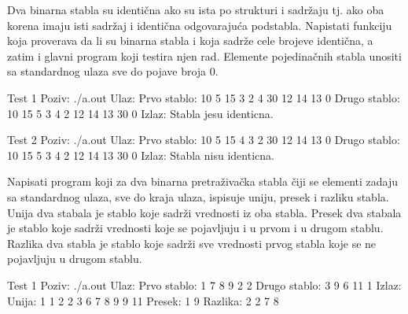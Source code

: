 \begin{Exercise}[label=707]
Dva binarna stabla su identična ako su ista po strukturi i sadržaju tj. ako oba korena imaju isti sadržaj i identična odgovarajuća podstabla. Napistati funkciju  koja proverava da li su binarna stabla  i  koja sadrže cele brojeve identična, a zatim i glavni program koji testira njen rad. Elemente pojedinačnih stabla unositi sa standardnog ulaza sve do pojave broja $0$.

\begin{maxitest}
\begin{test}{Test 1}
Poziv: ./a.out
Ulaz:
	Prvo stablo: 10 5 15 3 2 4 30 12 14 13 0
	Drugo stablo: 10 15 5 3 4 2 12 14 13 30 0
Izlaz:
	Stabla jesu identicna.
\end{test}
\end{maxitest}

\begin{maxitest}
\begin{test}{Test 2}
Poziv: ./a.out
Ulaz:
	Prvo stablo: 10 5 15 4 3 2 30 12 14 13 0
	Drugo stablo: 10 15 5 3 4 2 12 14 13 30 0
Izlaz:
	Stabla nisu identicna.
\end{test}
\end{maxitest}

\end{Exercise}

\begin{Answer}[ref=707]
\end{Answer}


\begin{Exercise}[label=708, difficulty=1]
Napisati program koji za dva binarna pretraživačka stabla čiji se elementi zadaju sa standardnog ulaza, sve do kraja ulaza, ispisuje uniju, presek i razliku stabla. Unija dva stabala je stablo koje sadrži vrednosti iz oba stabla. Presek dva stabala je stablo koje sadrži vrednosti koje se pojavljuju i u prvom i u drugom stablu. Razlika dva stabla je stablo koje sadrži sve vrednosti prvog stabla koje se ne pojavljuju u drugom stablu. 

\begin{miditest}
\begin{test}{Test 1}
Poziv: ./a.out
Ulaz:
	Prvo stablo: 1 7 8 9 2 2
	Drugo stablo: 3 9 6 11 1
Izlaz:
	Unija:  1 1 2 2 3 6 7 8 9 9 11
	Presek: 1 9 
	Razlika: 2 2 7 8 
\end{test}
\end{miditest}


\end{Exercise}

